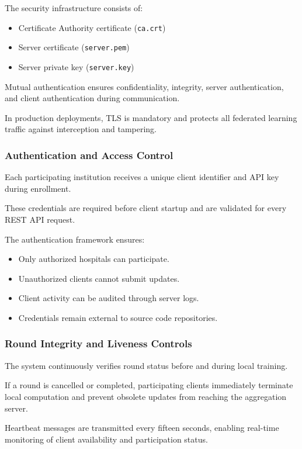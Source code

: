 The security infrastructure consists of:

\begin{itemize}
	\item Certificate Authority certificate (\texttt{ca.crt})
	\item Server certificate (\texttt{server.pem})
	\item Server private key (\texttt{server.key})
\end{itemize}

Mutual authentication ensures confidentiality, integrity, server authentication, and client authentication during communication.

In production deployments, TLS is mandatory and protects all federated learning traffic against interception and tampering.

\subsubsection{Authentication and Access Control}

Each participating institution receives a unique client identifier and API key during enrollment.

These credentials are required before client startup and are validated for every REST API request.

The authentication framework ensures:

\begin{itemize}
	\item Only authorized hospitals can participate.
	\item Unauthorized clients cannot submit updates.
	\item Client activity can be audited through server logs.
	\item Credentials remain external to source code repositories.
\end{itemize}

\subsubsection{Round Integrity and Liveness Controls}

The system continuously verifies round status before and during local training.

If a round is cancelled or completed, participating clients immediately terminate local computation and prevent obsolete updates from reaching the aggregation server.

Heartbeat messages are transmitted every fifteen seconds, enabling real-time monitoring of client availability and participation status.

